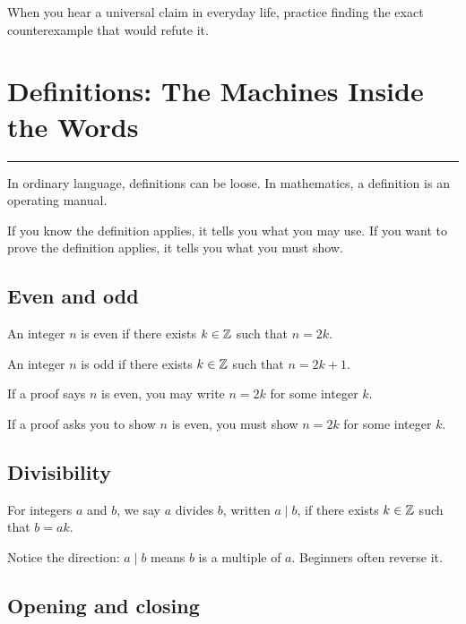 \documentclass[12pt]{article}
\newcommand{\chapterline}{\vspace{0.4em}\hrule\vspace{0.8em}}
\begin{document}
\begin{walkbox}
When you hear a universal claim in everyday life, practice finding the exact counterexample that would refute it.
\end{walkbox}

\newpage
\section{Definitions: The Machines Inside the Words}
\chapterline

In ordinary language, definitions can be loose. In mathematics, a definition is an operating manual.

If you know the definition applies, it tells you what you may use. If you want to prove the definition applies, it tells you what you must show.

\subsection{Even and odd}

\begin{definition}
An integer $n$ is even if there exists $k\in\mathbb{Z}$ such that $n=2k$.
\end{definition}

\begin{definition}
An integer $n$ is odd if there exists $k\in\mathbb{Z}$ such that $n=2k+1$.
\end{definition}

If a proof says $n$ is even, you may write $n=2k$ for some integer $k$.

If a proof asks you to show $n$ is even, you must show $n=2k$ for some integer $k$.

\subsection{Divisibility}

\begin{definition}
For integers $a$ and $b$, we say $a$ divides $b$, written $a\mid b$, if there exists $k\in\mathbb{Z}$ such that $b=ak$.
\end{definition}

Notice the direction: $a\mid b$ means $b$ is a multiple of $a$. Beginners often reverse it.

\subsection{Opening and closing}
\end{document}
